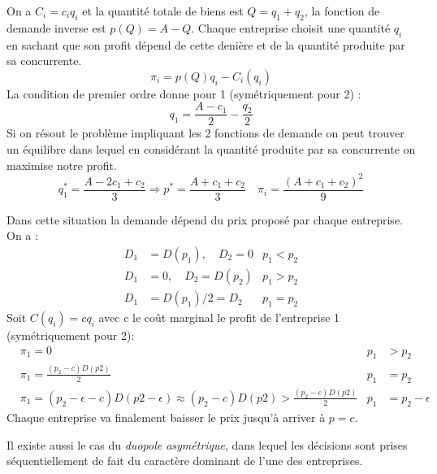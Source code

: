 \begin{tcolorbox}[title=Duopole de Cournot]
	
	On a $C_i=c_iq_i$ et la quantité totale de biens est $Q=q_1+q_2$, la fonction de demande inverse est $p(Q)=A-Q$.
	Chaque entreprise choisit une quantité $q_i$ en sachant que son profit dépend de cette denière et de la quantité produite par sa concurrente.
	\[
		\pi_i = p(Q)q_i-C_i(q_i)
	\]
	La condition de premier ordre donne pour 1 (symétriquement pour 2) :
	\[
		q_1 = \frac{A-c_1}{2}-\frac{q_2}{2}
	\]
	Si on résout le problème impliquant les 2 fonctions de demande on peut trouver un équilibre dans lequel en considérant la quantité produite par sa concurrente on maximise notre profit.
	\[
		q_1^* = \frac{A-2c_1+c_2}{3} \Rightarrow p^* = \frac{A+c_1+c_2}{3} \quad \pi_i= \frac{(A+c_1+c_2)^2}{9}
	\]
	
\end{tcolorbox}

\begin{tcolorbox}[title=Duopole de Bertrand]
	
	Dans cette situation la demande dépend du prix proposé par chaque entreprise. On a : 
	\begin{align*}
		D_1 &= D(p_1), \quad D_2=0  &p_1<p_2 \\
		D_1 &= 0, \quad D_2 = D(p_2)  &p_1>p_2 \\
		D_1 &= D(p_1)/2 = D_2 &p_1=p_2
	\end{align*}
	Soit $C(q_i)=cq_i$ avec c le coût marginal le profit de l'entreprise 1 (symétriquement pour 2):
	\begin{align*}
		&\pi_1=0  &p_1&>p_2 \\
		&\pi_1 = \frac{(p_2-c)D(p2)}{2} &p_1&=p_2 \\
		&\pi_1= (p_2-\epsilon-c)D(p2-\epsilon) \approx (p_2-c)D(p2)> \frac{(p_2-c)D(p2)}{2} &p_1&=p_2-\epsilon
	\end{align*}
	Chaque entreprise va finalement baisser le prix jusqu'à arriver à $p=c$.
	
\end{tcolorbox}

Il existe aussi le cas du \emph{duopole asymétrique}, dans lequel les décisions sont prises séquentiellement de fait du caractère dominant de l'une des entreprises.


